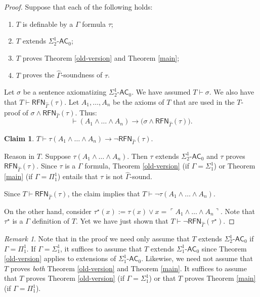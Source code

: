 \documentclass{amsart}
\newtheorem*{claim}{Claim}
\theoremstyle{definition}
\theoremstyle{remark}
\newtheorem{remark}[theorem]{Remark}
\begin{document}
\begin{proof}
Suppose that each of the following holds:
\begin{enumerate}
    \item $T$ is definable by a $\Gamma$ formula $\tau$;
    \item $T$ extends $\Sigma^1_2\text{-}\mathsf{AC}_0$;
    \item $T$ proves Theorem \ref{old-version} and Theorem \ref{main};
    \item $T$ proves the $\widehat\Gamma$-soundness of $\tau$.
\end{enumerate}
Let $\sigma$ be a sentence axiomatizing $\Sigma^1_2\text{-}\mathsf{AC}_0$. We have assumed $T\vdash \sigma$. We also have that $T\vdash \mathsf{RFN}_{\widehat\Gamma}(\tau)$. Let $A_1,\dots,A_n$ be the axioms of $T$ that are used in the $T$-proof of $\sigma\wedge \mathsf{RFN}_{\widehat\Gamma}(\tau)$. Thus:
$$\vdash (A_1\wedge\dots\wedge A_n) \to \big(\sigma\wedge \mathsf{RFN}_{\widehat\Gamma}(\tau)\big).$$

\begin{claim}
    $T\vdash \tau(A_1\wedge\dots\wedge A_n) \to \neg \mathsf{RFN}_{\widehat\Gamma}(\tau).$
\end{claim}
Reason in $T$. Suppose $\tau(A_1\wedge\dots\wedge A_n)$. Then $\tau$ extends $\Sigma^1_2\text{-}\mathsf{AC}_0$ and $\tau$ proves $\mathsf{RFN}_{\widehat\Gamma}(\tau)$. Since $\tau$ is a $\Gamma$ formula, Theorem \ref{old-version} (if $\Gamma=\Sigma^1_1$) or Theorem \ref{main} (if $\Gamma=\Pi^1_1$) entails that $\tau$ is not $\widehat\Gamma$-sound.


Since $T\vdash \mathsf{RFN}_{\widehat\Gamma}(\tau)$, the claim implies that $T\vdash \neg \tau(A_1\wedge\dots\wedge A_n)$.

On the other hand, consider $\tau^\star(x):=\tau(x) \vee x=\ulcorner A_1\wedge\dots\wedge A_n\urcorner$. Note that $\tau^\star$ is a $\Gamma$ definition of $T$. Yet we have just shown that $T\vdash \neg \mathsf{RFN}_{\widehat\Gamma}(\tau^\star)$.
\end{proof}

\begin{remark}
    Note that in the proof we need only assume that $T$ extends $\Sigma^1_2\text{-}\mathsf{AC}_0$ if $\Gamma=\Pi^1_1$. If $\Gamma=\Sigma^1_1$, it suffices to assume that $T$ extends $\Sigma^1_1\text{-}\mathsf{AC}_0$ since Theorem \ref{old-version} applies to extensions of $\Sigma^1_1\text{-}\mathsf{AC}_0$. Likewise, we need not assume that $T$ proves \emph{both} Theorem \ref{old-version} and Theorem \ref{main}. It suffices to assume that $T$ proves Theorem \ref{old-version} (if $\Gamma=\Sigma^1_1$) or that $T$ proves Theorem \ref{main} (if $\Gamma=\Pi^1_1$).
\end{remark}
\end{document}

